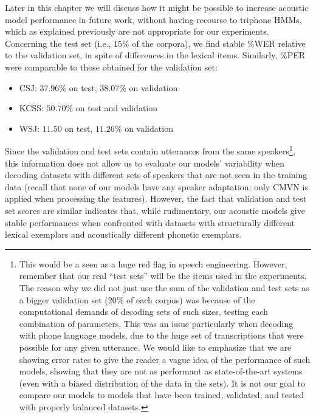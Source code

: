 Later in this chapter we will discuss how it might be possible to increase acoustic model performance in future work, without having recourse to triphone HMMs, which as explained previously are not appropriate for our experiments.  \\

Concerning the test set (i.e., $15\%$ of the corpora), we find stable \%WER relative to the validation set, in spite of differences in the lexical items. %
Similarly, \%PER were comparable to those obtained for the validation set:

\begin{itemize}
  \item CSJ: $37.96\%$ on test, $38.07\%$ on validation
  \item KCSS: $50.70\%$ on test and validation
  \item WSJ: $11.50$ on test, $11.26\%$ on validation 
  \end{itemize}
  
Since the validation and test sets contain utterances from the same speakers\footnote{This would be a seen as a huge red flag in speech engineering. However, remember that our real ``test sets'' will be the items used in the experiments. The reason why we did not just use the sum of the validation and test sets as a bigger validation set ($20\%$ of each corpus) was because of the computational demands of decoding sets of such sizes, testing each combination of parameters. This was an issue particularly when decoding with phone language models, due to the huge set of transcriptions that were possible for any given utterance. We would like to emphasize that we are showing error rates to give the reader a vague idea of the performance of such models, showing that they are not as performant as state-of-the-art systems (even with a biased distribution of the data in the sets). It is not our goal to compare our models to models that have been trained, validated, and tested with properly balanced datasets.}, this information does not allow us to evaluate our models' variability when decoding datasets with different sets of speakers that are not seen in the training data (recall that none of our models have any speaker adaptation; only CMVN is applied when processing the features). However, the fact that validation and test set scores are similar indicates that, while rudimentary, our acoustic models give stable performances when confronted with datasets with structurally different lexical exemplars and acoustically different phonetic exemplars.   

